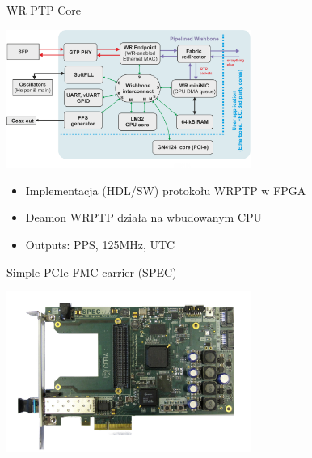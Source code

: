\documentclass[compress,red]{beamer}
\begin{document}
\begin{frame}{WR PTP Core}





    \begin{center}
    \includegraphics[width=8.0cm]{node/wrpc_v1.pdf}
    \end{center}

  \begin{itemize}
    \item Implementacja (HDL/SW) protokołu WRPTP w FPGA
    \item Deamon WRPTP działa na wbudowanym CPU
    \item Outputs: PPS, 125MHz, UTC
  \end{itemize}






\end{frame}
\begin{frame}{Simple PCIe FMC carrier (SPEC)}

    \begin{center}
    \includegraphics[width=8.0cm]{node/spec_photo.jpg}
    \end{center}


\end{frame}
\end{document}

